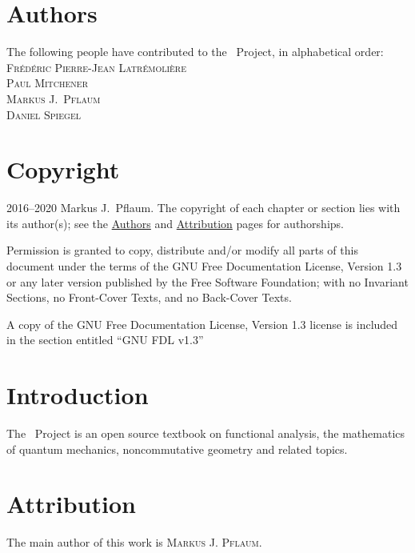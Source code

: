 
\chapter*{Authors}
\label{section-authors}

The following people have contributed to the \fancy\ Project, 
in alphabetical order: \\[2mm]
{\scshape 
  Fr\'ed\'eric Pierre-Jean Latr\'emoli\`ere \\
  Paul Mitchener\\
  Markus J.~Pflaum\\
  Daniel Spiegel
}

\chapter*{Copyright}
\label{section-copyright}

{\textcopyright}  2016--2020 Markus J.~Pflaum. The copyright of each chapter
or section lies with its author(s); see the \hyperref[section-authors]{Authors}
and \hyperref[section-attribution]{Attribution} pages for authorships.

Permission is granted 
to copy, distribute and/or modify all parts of this document under the terms of
the GNU Free Documentation License, Version 1.3 or any later version published 
by the Free Software Foundation; with no Invariant Sections, no Front-Cover 
Texts, and no Back-Cover Texts.

A copy of the GNU Free Documentation License, Version 1.3 license is included 
in the section entitled ``GNU FDL v1.3''

\tableofcontents
{}


\chapter*{Introduction}
\label{section-introduction}

The \fancy\ Project is an open source textbook on functional analysis, the mathematics of quantum mechanics, noncommutative geometry and related topics.

\chapter*{Attribution}
\label{section-attribution}
 The main author of this work is \textsc{Markus J. Pflaum}.

